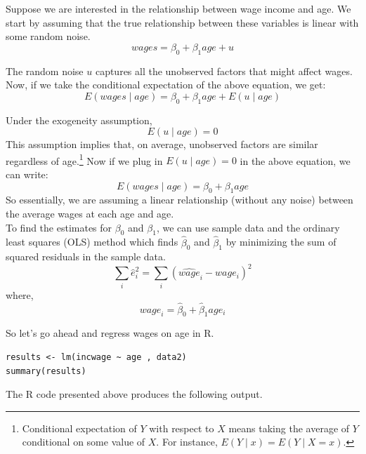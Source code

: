 \documentclass{./../handout}
\begin{document}
\thispagestyle{plain}
\begin{center}
\end{center}	


Suppose we are interested in the relationship between wage income and age. We start by assuming that the true relationship between these variables is linear with some random noise. 
$$ wages = \beta_0 + \beta_1 age + u  $$

The random noise $u$ captures all the unobserved factors that might affect wages. Now, if we take the conditional expectation of the above equation, we get:
$$ E\left( wages \mid age \right) = \beta_0 + \beta_1 age + E\left( u \mid age \right) $$

Under the exogeneity assumption, $$ E\left( u \mid age \right) = 0$$
This assumption implies that, on average, unobserved factors are similar regardless of age.\footnote{Conditional expectation of $Y$ with respect to $X$ means taking the average of $Y$ conditional on some value of $X$. For instance, $E(Y\mid x) = E(Y \mid X = x)$.} Now if we plug in $E\left( u \mid age \right) = 0$ in the above equation, we can write:
$$ E\left( wages \mid age \right) = \beta_0 + \beta_1 age  $$
So essentially, we are assuming a linear relationship (without any noise) between the average wages at each age and age. \\

To find the estimates for $\beta_0$ and $\beta_1$, we can use sample data and the ordinary least squares (OLS) method which finds $\hat{\beta}_0$ and $\hat{\beta}_1$ by minimizing the sum of squared residuals in the sample data. $$ \sum_i \hat{e}_i^2 = \sum_i (\hat{wage}_i-wage_i)^2  $$
where, 
$$ \hat{wage}_i = \hat{\beta}_0 + \hat{\beta}_1 age_i  $$ 

\newpage
So let's go ahead and regress wages on age in R.
 
\begin{lstlisting}
results <- lm(incwage ~ age , data2)
summary(results)
\end{lstlisting}

The R code presented above produces the following output. \\
\end{document}
